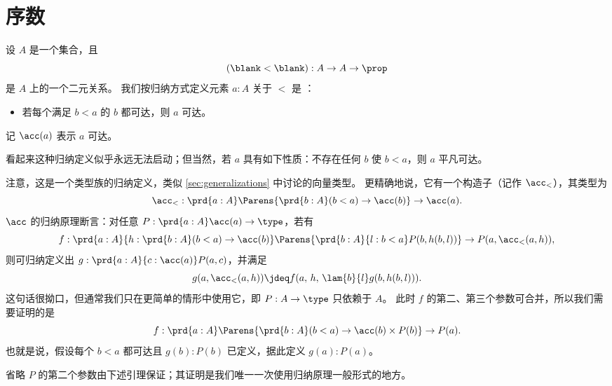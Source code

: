 \section{序数}
\label{sec:ordinals}

%

\begin{defn}\label{defn:accessibility}
  设 $A$ 是一个集合，且
  \[(\blank<\blank):A\to A\to \prop\]
  是 $A$ 上的一个二元关系。
  我们按归纳方式定义元素 $a:A$ 关于 $<$ 是
  ：
  \begin{itemize}
  \item 若每个满足 $b<a$ 的 $b$ 都可达，则 $a$ 可达。
  \end{itemize}
  记 $\acc(a)$ 表示 $a$ 可达。
\end{defn}

看起来这种归纳定义似乎永远无法启动；但当然，若 $a$ 具有如下性质：不存在任何 $b$ 使 $b<a$，则 $a$ 平凡可达。

注意，这是一个类型族的归纳定义，类似 \cref{sec:generalizations} 中讨论的向量类型。
更精确地说，它有一个构造子（记作 $\acc_<$），其类型为
\[ \acc_< : \prd{a:A} \Parens{\prd{b:A} (b<a) \to \acc(b)} \to \acc(a). \]
%
$\acc$ 的归纳原理断言：对任意 $P:\prd{a:A} \acc(a) \to \type$，若有
\[f:\prd{a:A}{h:\prd{b:A} (b<a) \to \acc(b)}
\Parens{\prd{b:A}{l:b<a} P(b,h(b,l))} \to
P(a,\acc_<(a,h)),
\]
则可归纳定义出 $g:\prd{a:A}{c:\acc(a)} P(a,c)$，并满足
\[g(a,\acc_<(a,h)) \jdeq f(a,\,h,\,\lam{b}{l} g(b,h(b,l))).\]
这句话很拗口，但通常我们只在更简单的情形中使用它，即 $P:A\to\type$ 只依赖于 $A$。
此时 $f$ 的第二、第三个参数可合并，所以我们需要证明的是
\[f:\prd{a:A} \Parens{\prd{b:A} (b<a) \to \acc(b) \times P(b)}
\to P(a).
\]
也就是说，假设每个 $b<a$ 都可达且 $g(b):P(b)$ 已定义，据此定义 $g(a):P(a)$。

省略 $P$ 的第二个参数由下述引理保证；其证明是我们唯一一次使用归纳原理一般形式的地方。

